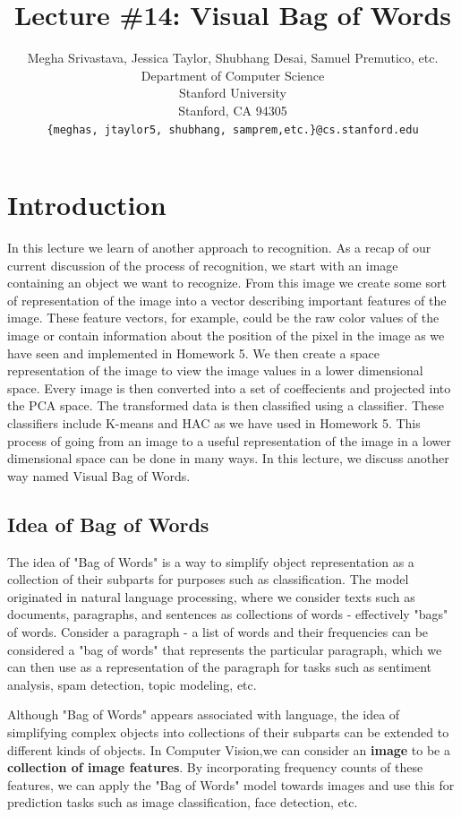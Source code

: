 \documentclass{article}
\title{Lecture \#14: Visual Bag of Words}
\author{
  Megha Srivastava, Jessica Taylor, Shubhang Desai, Samuel Premutico,  etc. \\
  Department of Computer Science\\
  Stanford University\\
  Stanford, CA 94305 \\
  \texttt{\{meghas, jtaylor5, shubhang, samprem,etc.\}@cs.stanford.edu} \\
}
\begin{document}
\maketitle


\section{Introduction}	
In this lecture we learn of another approach to recognition. As a recap of our current discussion of the process of recognition, we start with an image containing an object we want to recognize. From this image we create some sort of representation of the image into a vector describing important features of the image.  These feature vectors, for example, could be the raw color values of the image or contain information about the position of the pixel in the image as we have seen and implemented in Homework 5. We then create a space representation of the image to view the image values in a lower dimensional space.  Every image is then converted into a set of coeffecients and projected into the PCA space.  The transformed data is then classified using a classifier. These classifiers include K-means and HAC as we have used in Homework 5.  This process of going from an image to a useful representation of the image in a lower dimensional space can be done in many ways.  In this lecture, we discuss another way named Visual Bag of Words.

\subsection{Idea of Bag of Words}
The idea of "Bag of Words" is a way to simplify object representation as a collection of their subparts for purposes such as classification. The model originated in natural language processing, where we consider texts such as documents, paragraphs, and sentences as collections of words - effectively "bags" of words. Consider a paragraph - a list of words and their frequencies can be considered a "bag of words" that represents the particular paragraph, which we can then use as a representation of the paragraph for tasks such as sentiment analysis, spam detection, topic modeling, etc. 

Although "Bag of Words" appears associated with language, the idea of simplifying complex objects into collections of their subparts can be extended to different kinds of objects. In Computer Vision,we can consider an \textbf{image} to be a \textbf{collection of image features}. By incorporating frequency counts of these features, we can apply the "Bag of Words" model towards images and use this for prediction tasks such as image classification, face detection, etc.
\end{document}
